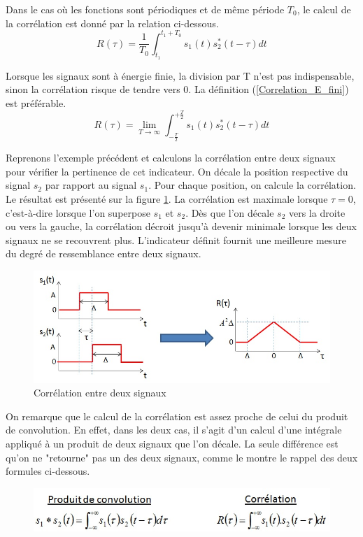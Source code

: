 	Dans le cas où les fonctions sont périodiques et de même période $T_{0}$, le calcul de la corrélation est donné par la relation ci-dessous.
	\begin{equation}\label{Prod_conv_periodique}
	R(\tau)=\frac{1}{T_{0}}\int_{t_{1}}^{t_{1}+T_{0}}s_{1}(t)s^{*}_{2}(t-\tau)dt
	\end{equation}
	
	Lorsque les signaux sont à énergie finie, la division par T n'est pas indispensable, sinon la corrélation risque de tendre vers 0. La définition (\ref{Correlation_E_fini}) est préférable.
	\begin{equation}\label{Correlation_E_fini}
	R(\tau)=\lim_{T \to \infty}\int_{-\frac{T}{2}}^{+\frac{T}{2}}s_{1}(t)s^{*}_{2}(t-\tau)dt
	\end{equation}
	 
	
	Reprenons l'exemple précédent et calculons la corrélation entre deux signaux pour vérifier la pertinence de cet indicateur. On décale la position respective du signal $s_{2}$ par rapport au signal $s_{1}$. Pour chaque position, on calcule la corrélation. Le résultat est présenté sur la figure \ref{Fig:ressemblance_via_convolution}. La corrélation est maximale lorsque $\tau = 0$, c'est-à-dire lorsque l'on superpose $s_{1}$ et $s_{2}$. Dès que l'on décale $s_{2}$ vers la droite ou vers la gauche, la corrélation décroit jusqu'à devenir minimale lorsque les deux signaux ne se recouvrent plus. L'indicateur définit fournit une meilleure mesure du degré de ressemblance entre deux signaux.  
	
	\begin{figure}[h!]
		\centering
		\includegraphics[scale=0.6]{images/ressemblance_via_convolution.jpg}
		\caption{Corrélation entre deux signaux}	
		\label{Fig:ressemblance_via_convolution} 
	\end{figure}

	On remarque que le calcul de la corrélation est assez proche de celui du produit de convolution. En effet, dans les deux cas, il s'agit d'un calcul d'une intégrale appliqué à un produit de deux signaux que l'on décale. La seule différence est qu'on ne "retourne" pas un des deux signaux, comme le montre le rappel des deux formules ci-dessous.
	\begin{figure}[h!]
		\centering
		\includegraphics[scale=0.6]{images/convo_vs_correlation.jpg} 
	\end{figure}

